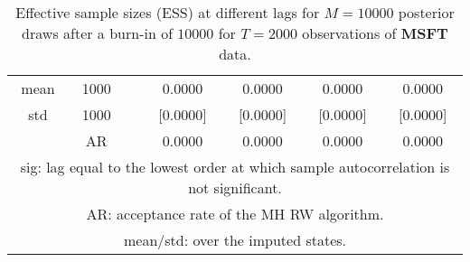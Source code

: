 {\begin{table}
\begin{tabular}{ccc cc cc}
mean & 1000 &  & 0.0000  & 0.0000  & 0.0000  & 0.0000  \\ 
std & 1000 &  & [0.0000]  & [0.0000]  & [0.0000]  & [0.0000]  \\  [1ex]
 & AR &  & 0.0000  & 0.0000  & 0.0000  & 0.0000  \\  [1ex]
\hline 
\multicolumn{7}{p{11cm}}{\footnotesize{sig: lag equal to the lowest order at which sample autocorrelation is not significant.}}  \\ 
\multicolumn{7}{p{11cm}}{\footnotesize{AR: acceptance rate of the MH RW algorithm.}}  \\ 
\multicolumn{7}{p{11cm}}{\footnotesize{mean/std: over the imputed states.}}  \\ 
\end{tabular}
 \caption{Effective sample sizes (ESS) at different lags  for $M=10000$ posterior draws after a burn-in of $10000$ for $T=2000$ observations of \textbf{MSFT} data.}
\label{tab:ESS_MSFT}  
\end{table}
}
